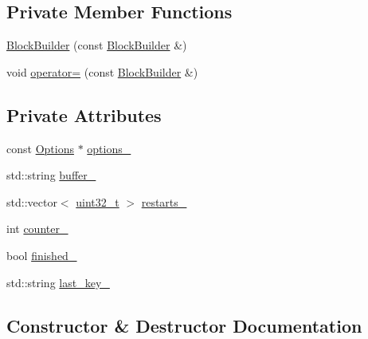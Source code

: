 \subsection*{Private Member Functions}
\begin{DoxyCompactItemize}
\item 
\hyperlink{classleveldb_1_1_block_builder_a4b15244785d500c55c34b51ec0553c0d}{Block\+Builder} (const \hyperlink{classleveldb_1_1_block_builder}{Block\+Builder} \&)
\item 
void \hyperlink{classleveldb_1_1_block_builder_a8819087efd18557a877e0dbda3a4c7e6}{operator=} (const \hyperlink{classleveldb_1_1_block_builder}{Block\+Builder} \&)
\end{DoxyCompactItemize}
\subsection*{Private Attributes}
\begin{DoxyCompactItemize}
\item 
const \hyperlink{structleveldb_1_1_options}{Options} $\ast$ \hyperlink{classleveldb_1_1_block_builder_ac3f2a6bc77ee0f695192c54465d59e92}{options\+\_\+}
\item 
std\+::string \hyperlink{classleveldb_1_1_block_builder_a1f9aa245988ddb04590fc863fd51210e}{buffer\+\_\+}
\item 
std\+::vector$<$ \hyperlink{stdint_8h_a435d1572bf3f880d55459d9805097f62}{uint32\+\_\+t} $>$ \hyperlink{classleveldb_1_1_block_builder_ae3eedf26b4ac597e5190bef0c6b75179}{restarts\+\_\+}
\item 
int \hyperlink{classleveldb_1_1_block_builder_aeaa73f33ffc96b7bf54f8d1c88fe730a}{counter\+\_\+}
\item 
bool \hyperlink{classleveldb_1_1_block_builder_a15fd67e3114b72c9a27c9309f8ca97f8}{finished\+\_\+}
\item 
std\+::string \hyperlink{classleveldb_1_1_block_builder_a546acee0fa90a8e9585f8d369aaf09f3}{last\+\_\+key\+\_\+}
\end{DoxyCompactItemize}


\subsection{Constructor \& Destructor Documentation}
\hypertarget{classleveldb_1_1_block_builder_a697ffa03ff6e8f5dec0558c05136f89c}{}
